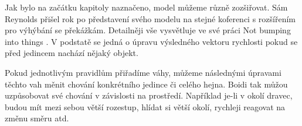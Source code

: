 Jak bylo na začátku kapitoly naznačeno, model můžeme různě zozšiřovat. Sám Reynolds přišel rok po představení svého modelu na stejné koferenci s rozšířením pro výhýbání se překážkám. Detailněji vše vysvětluje ve své práci Not bumping into things \cite{ReynoldsBoidNoBump}. V podstatě se jedná o úpravu výsledného vektoru rychlosti pokud se před jedincem nachází nějaký objekt. 
\par
Pokud jednotlivým pravidlům přiřadíme váhy, můžeme následnými úpravami těchto vah měnit chování konkrétního jedince či celého hejna. Boidi tak můžou uzpůsobovat své chování v závislosti na prostředí. Například je-li v okolí dravec, budou mít mezi sebou větší rozestup, hlídat si větší okolí, rychleji reagovat na změnu směru atd. 